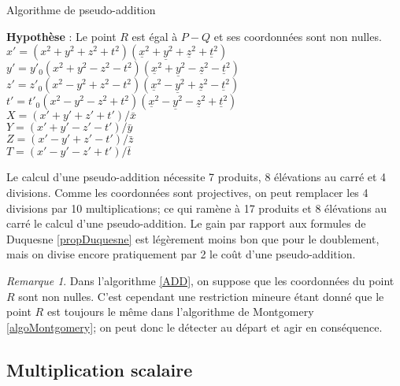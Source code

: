 \documentclass[a4paper]{article}
\theoremstyle{definition}
\theoremstyle{remark}
\newtheorem{remarque}{Remarque}
\numberwithin{equation}{section}
\begin{document}
\begin{algorithm}
\label{ADD}
\caption{Algorithme de pseudo-addition}
\textbf{Hypothèse} : Le point $R$ est égal à $P-Q$ et ses coordonnées sont non nulles. \\
$x' = (x^2 + y^2 + z^2 + t^2)(\underline{x}^2 + \underline{y}^2 + \underline{z}^2 + \underline{t}^2)$ \\
$y' = y'_0(x^2 + y^2 - z^2 - t^2)(\underline{x}^2 + \underline{y}^2 - \underline{z}^2 - \underline{t}^2)$ \\
$z' = z'_0(x^2 - y^2 + z^2 - t^2)(\underline{x}^2 - \underline{y}^2 + \underline{z}^2 - \underline{t}^2)$ \\
$t' = t'_0(x^2 - y^2 - z^2 + t^2)(\underline{x}^2 - \underline{y}^2 - \underline{z}^2 + \underline{t}^2)$ \\
$X = (x' + y' + z' + t')/\bar{x}$ \\
$Y = (x' + y' - z' - t')/\bar{y}$ \\
$Z = (x' - y' + z' - t')/\bar{z}$ \\
$T = (x' - y' - z' + t')/\bar{t}$ \\
\end{algorithm}

Le calcul d'une pseudo-addition nécessite 7 produits, 8 élévations au carré et 4 divisions. Comme les coordonnées sont projectives, on peut remplacer les 4 divisions par 10 multiplications; ce qui ramène à 17 produits et 8 élévations au carré le calcul d'une pseudo-addition. Le gain par rapport aux formules de Duquesne \ref{propDuquesne} est légèrement moins bon que pour le doublement, mais on divise encore pratiquement par 2 le coût d'une pseudo-addition.

\begin{remarque}
Dans l'algorithme \ref{ADD}, on suppose que les coordonnées du point $R$ sont non nulles. C'est cependant une restriction mineure étant donné que le point $R$ est toujours le même dans l'algorithme de Montgomery \ref{algoMontgomery}; on peut donc le détecter au départ et agir en conséquence.
\end{remarque}

\subsection{Multiplication scalaire}
\end{document}

